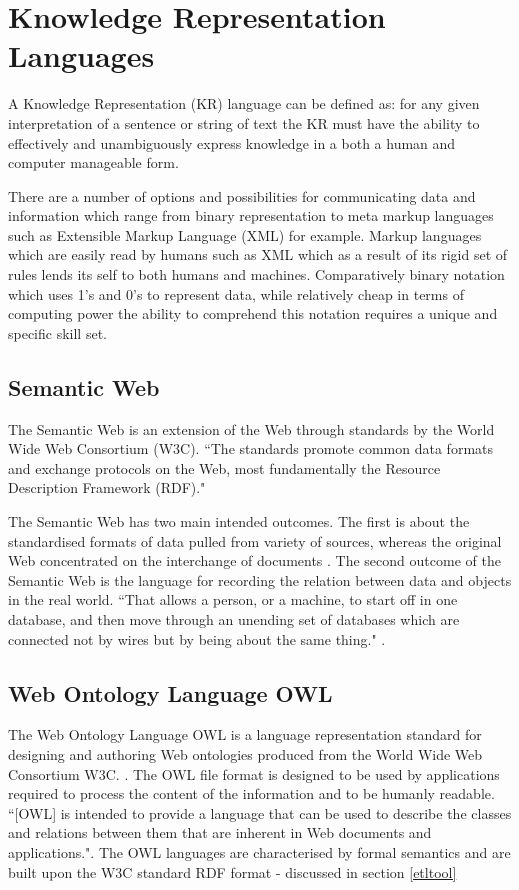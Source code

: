 \section{Knowledge Representation Languages}
A Knowledge Representation (KR) language can be defined as: for any given interpretation of a sentence or string of text the KR must have the ability to effectively and unambiguously express knowledge in a both a human and computer manageable form. 

There are a number of options and possibilities for communicating data and information which range from binary representation to meta markup languages such as Extensible Markup Language (XML) for example. Markup languages which are easily read by humans such as XML which as a result of its rigid set of rules lends its self to both humans and machines. Comparatively binary notation which uses 1's and 0's to represent data, while relatively cheap in terms of computing power the ability to comprehend this notation requires a unique and specific skill set.

\subsection{Semantic Web}\label{semanticweb}
The Semantic Web is an extension of the Web through standards by the World Wide Web Consortium (W3C). ``The standards promote common data formats and exchange protocols on the Web, most fundamentally the Resource Description Framework (RDF)." \cite{semantic}

The Semantic Web has two main intended outcomes. The first is about the standardised formats of data pulled from variety of sources, whereas the original Web concentrated on the interchange of documents \cite{semantic}. The second outcome of the Semantic Web is the language for recording the relation between data and objects in the real world. ``That allows a person, or a machine, to start off in one database, and then move through an unending set of databases which are connected not by wires but by being about the same thing."  \cite{semantic}. 

\subsection{Web Ontology Language OWL}\label{owl}
The Web Ontology Language OWL is a language representation standard for designing and authoring Web ontologies produced from the World Wide Web Consortium W3C. \cite{owl}. The OWL file format is designed to be used by applications required to process the content of the information and to be humanly readable. ``[OWL] is intended to provide a language that can be used to describe the classes and relations between them that are inherent in Web documents and applications."\cite{owl}. The OWL languages are characterised by formal semantics and are built upon the W3C standard RDF format - discussed in section \ref{etltool}

